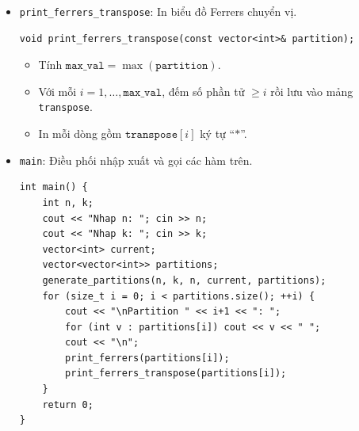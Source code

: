 \documentclass[a4paper,12pt]{article}
\begin{document}
\begin{itemize}
  \item \texttt{print\_ferrers\_transpose}: In biểu đồ Ferrers chuyển vị.
    \begin{lstlisting}[style=cppstyle]
void print_ferrers_transpose(const vector<int>& partition);
    \end{lstlisting}
    \begin{itemize}
      \item Tính \(\texttt{max\_val} = \max(\texttt{partition})\).  
      \item Với mỗi \(i=1,\dots,\texttt{max\_val}\), đếm số phần tử \(\ge i\) rồi lưu vào mảng \texttt{transpose}.  
      \item In mỗi dòng gồm \(\texttt{transpose}[i]\) ký tự “\(\ast\)”.
    \end{itemize}
  \item \texttt{main}: Điều phối nhập xuất và gọi các hàm trên.
    \begin{lstlisting}[style=cppstyle]
int main() {
    int n, k;
    cout << "Nhap n: "; cin >> n;
    cout << "Nhap k: "; cin >> k;
    vector<int> current;
    vector<vector<int>> partitions;
    generate_partitions(n, k, n, current, partitions);
    for (size_t i = 0; i < partitions.size(); ++i) {
        cout << "\nPartition " << i+1 << ": ";
        for (int v : partitions[i]) cout << v << " ";
        cout << "\n";
        print_ferrers(partitions[i]);
        print_ferrers_transpose(partitions[i]);
    }
    return 0;
}
    \end{lstlisting}

\end{itemize}
\end{document}
